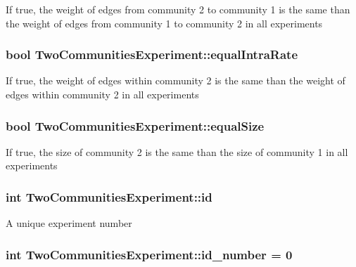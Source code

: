 If true, the weight of edges from community 2 to community 1 is the same than the weight of edges from community 1 to community 2 in all experiments \hypertarget{class_two_communities_experiment_a99af0c5678c67201a249206710e53412}{
\subsubsection[{equal\-Intra\-Rate}]{\setlength{\rightskip}{0pt plus 5cm}bool Two\-Communities\-Experiment\-::equal\-Intra\-Rate}}\label{class_two_communities_experiment_a99af0c5678c67201a249206710e53412}
If true, the weight of edges within community 2 is the same than the weight of edges within community 2 in all experiments \hypertarget{class_two_communities_experiment_a6c541a1436eb884e86c593c02035de85}{
\subsubsection[{equal\-Size}]{\setlength{\rightskip}{0pt plus 5cm}bool Two\-Communities\-Experiment\-::equal\-Size}}\label{class_two_communities_experiment_a6c541a1436eb884e86c593c02035de85}
If true, the size of community 2 is the same than the size of community 1 in all experiments \hypertarget{class_two_communities_experiment_a0249e614ce0ab3e019b334634d857d1c}{
\subsubsection[{id}]{\setlength{\rightskip}{0pt plus 5cm}int Two\-Communities\-Experiment\-::id}}\label{class_two_communities_experiment_a0249e614ce0ab3e019b334634d857d1c}
A unique experiment number \hypertarget{class_two_communities_experiment_ad4b14e0987399445740ff5a57fa4aa29}{
\subsubsection[{id\-\_\-number}]{\setlength{\rightskip}{0pt plus 5cm}int Two\-Communities\-Experiment\-::id\-\_\-number = 0\hspace{0.3cm}{\ttfamily [static]}}}\label{class_two_communities_experiment_ad4b14e0987399445740ff5a57fa4aa29}
